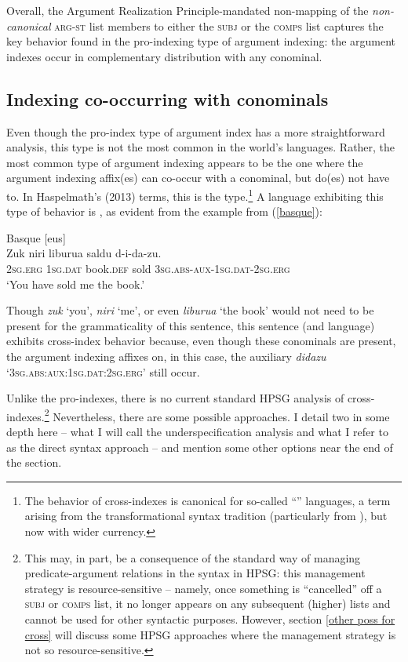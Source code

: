 \documentclass[output=paper]{langsci/langscibook}
\begin{document}
{Overall, the Argument Realization Principle-mandated non-mapping of the \textit{non-canonical} \textsc{arg-st} list members to either the \textsc{subj} or the \textsc{comps} list captures the key behavior found in the pro-indexing type of argument indexing: the argument indexes occur in complementary distribution with any conominal.    
 
\subsection{Indexing co-occurring with conominals} 

Even though the pro-index type of argument index has a more straightforward analysis, this type is not the most common in the world's languages. Rather, the most common type of argument indexing appears to be the one where the argument indexing affix(es) can co-occur with a conominal, but do(es) not have to.  In Haspelmath's (2013) terms, this is the  type.\footnote{The behavior of cross-indexes is canonical for so-called ``'' languages, a term arising from the transformational syntax tradition (particularly from \citealt{Chomsky81a}), but now with wider currency.} A language exhibiting this type of behavior is , as evident from the example from (\ref{basque}):    
%
\begin{exe}
\ex\label{basque} Basque [eus] \citep[98]{laka96} \\
\gll Zuk niri liburua saldu d-i-da-zu. \\
\textsc{2sg.erg} \textsc{1sg.dat} book.\textsc{def} sold \textsc{3sg.abs}-\textsc{aux}-\textsc{1sg.dat}-\textsc{2sg.erg} \\
\glt `You have sold me the book.' 
\end{exe} 
%
Though \textit{zuk} `you', \textit{niri} `me', or even \textit{liburua}  `the book' would not need to be present for the grammaticality of this sentence, this sentence (and language) exhibits cross-index behavior because, even though these conominals are present, the argument indexing affixes on, in this case, the auxiliary \textit{didazu} `\textsc{3sg.abs:aux:1sg.dat:2sg.erg}' still occur. 

Unlike the pro-indexes, there is no current standard HPSG analysis of cross-indexes.\footnote{This may, in part, be a consequence of the standard way of managing predicate-argument relations in the syntax in HPSG: this management strategy is resource-sensitive -- namely, once something is ``cancelled'' off a \textsc{subj} or \textsc{comps} list, it no longer appears on any subsequent (higher) lists and cannot be used for other syntactic purposes. However, section \ref{other poss for cross} will discuss some HPSG approaches where the management strategy is not so resource-sensitive.} Nevertheless, there are some possible approaches. I detail two in some depth here -- what I will call the underspecification analysis and what I refer to as the direct syntax approach -- and mention some other options near the end of the section.

}
\end{document}
